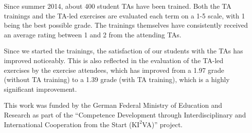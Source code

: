 \documentclass[sigconf,screen]{acmart}
\begin{document}
Since summer 2014, about 400 student TAs have been trained. 
Both the TA trainings and the TA-led exercises are evaluated each term on a 1-5 scale, 
with 1 being the best possible grade. The trainings themselves have consistently received an average
rating between 1 and 2 from the attending TAs.

Since we started the trainings, the satisfaction of our students with the TAs has improved noticeably.
This is also reflected in the evaluation of the TA-led exercises by the exercise 
attendees, which has improved from a 1.97 grade (without TA training) to a 1.39 grade (with 
TA training), which is a highly significant improvement.

\begin{acks}
This work was funded by the German Federal Ministry of Education and Research as part of the 
``Competence Development through Interdisciplinary and International Cooperation from the Start
(K$\mathrm{I^2}$VA)'' project.
\end{acks}



\end{document}
